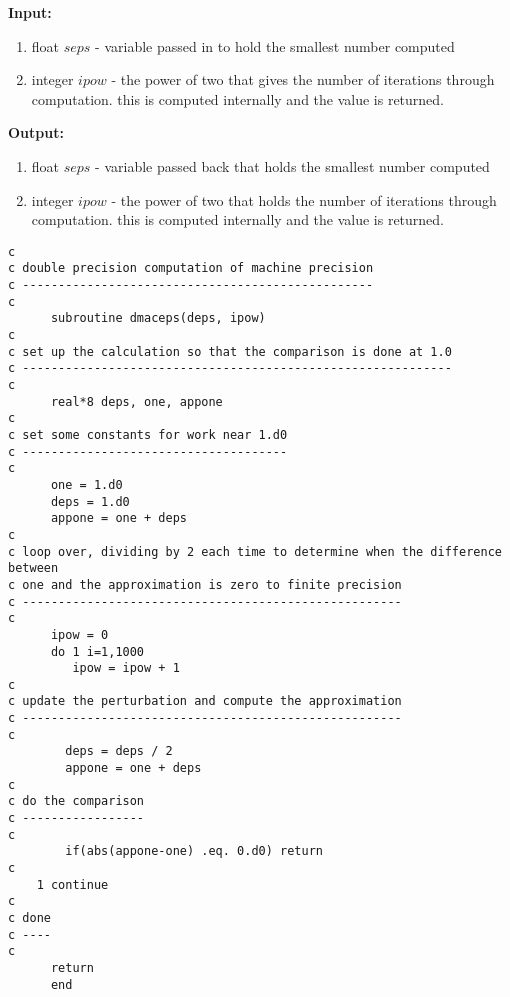 \vskip0.1in

\noindent
{\bf Input:}

\vskip0.1in

\begin{enumerate}
\item float $seps$ - variable passed in to hold the smallest number computed
\item integer $ipow$ - the power of two that gives the number of iterations
through computation. this is computed internally and the value is returned.
\end{enumerate}

\vskip0.1in

\noindent
{\bf Output:}

\vskip0.1in

\begin{enumerate}
\item float $seps$ - variable passed back that holds the smallest number
computed
\item integer $ipow$ - the power of two that holds the number of iterations
through computation. this is computed internally and the value is returned.
\end{enumerate}


\begin{verbatim}
c
c double precision computation of machine precision
c -------------------------------------------------
c
      subroutine dmaceps(deps, ipow)
c
c set up the calculation so that the comparison is done at 1.0
c ------------------------------------------------------------
c
      real*8 deps, one, appone
c
c set some constants for work near 1.d0
c -------------------------------------
c
      one = 1.d0
      deps = 1.d0
      appone = one + deps
c
c loop over, dividing by 2 each time to determine when the difference between
c one and the approximation is zero to finite precision
c -----------------------------------------------------
c
      ipow = 0
      do 1 i=1,1000
         ipow = ipow + 1
c
c update the perturbation and compute the approximation
c -----------------------------------------------------
c
        deps = deps / 2
        appone = one + deps
c
c do the comparison
c -----------------
c
        if(abs(appone-one) .eq. 0.d0) return
c
    1 continue
c
c done
c ----
c
      return
      end

\end{verbatim}

\newpage
